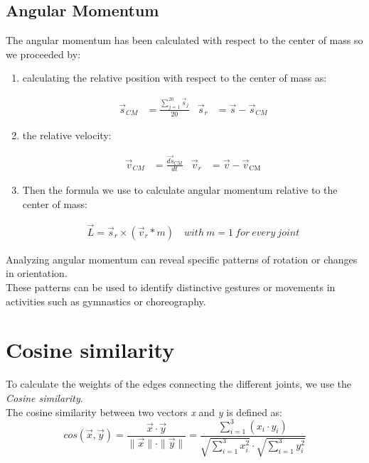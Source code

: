 \subsection{Angular Momentum}
The angular momentum has been calculated with respect to the center of mass so we proceeded by:
\begin{enumerate}
  \item calculating the relative position with respect to the center of mass as: 
  \begin{figure}[H]
    \centering
    \begin{align}
        \vec{s}_{CM} &= \frac{{\sum_{j=1}^{20} \vec{s}_{j}}}{{20}} &
        \vec{s}_{r} &= \vec{s} - \vec{s}_{CM} \label{eq:rel_pos}
    \end{align}
  \end{figure}
  \item the relative velocity:
  \begin{figure}[H]
    \centering
    \begin{align}
        \vec{v}_{CM} &= \frac{\vec{ds}_{CM}}{dt} &
        \vec{v}_{r} &= \vec{v} - \vec{v}_{\text{CM}} \label{eq:rel_vel}
    \end{align}
  \end{figure}
  \item Then the formula we use to calculate angular momentum relative to the center of mass:
  \begin{figure}[H]
    \centering
    \begin{align}
      \vec{L} = \vec{s}_{r} \times (\vec{v}_{r} * m) \quad with \ m = 1 \ for \ every \ joint \label{eq:ang_mom}
    \end{align}
  \end{figure}
\end{enumerate}

Analyzing angular momentum can reveal specific patterns of rotation or changes in orientation. \\
These patterns can be used to identify distinctive gestures or movements in activities such as gymnastics or choreography.

\section{Cosine similarity}
To calculate the weights of the edges connecting the different joints, we use the \textit{Cosine similarity}. \\
The cosine similarity between two vectors \textit{x} and \textit{y} is defined as:
\begin{equation}
  cos(\vec{x}, \vec{y}) = \frac{\vec{x} \cdot \vec{y}}{\|\vec{x}\| \cdot \|\vec{y}\|}  =  \frac{\sum_{i=1}^{3} (x_i \cdot y_i)}{\sqrt{\sum_{i=1}^{3} x_i^2} \cdot \sqrt{\sum_{i=1}^{3} y_i^2}} 
\end{equation}

